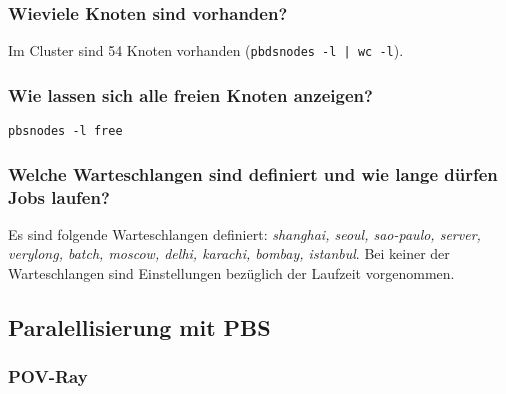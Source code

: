 \subsubsection{Wieviele Knoten sind vorhanden?}
	Im Cluster sind 54 Knoten vorhanden (\texttt{pbdsnodes -l | wc -l}).
\subsubsection{Wie lassen sich alle freien Knoten anzeigen?}
	\texttt{pbsnodes -l free}
\subsubsection{Welche Warteschlangen sind definiert und wie lange d\"urfen Jobs laufen?}
	Es sind folgende Warteschlangen definiert: 
	\textsl{shanghai, seoul, sao-paulo, server, verylong, batch, moscow, delhi,
	karachi, bombay, istanbul}.
	Bei keiner der Warteschlangen sind Einstellungen bezüglich der Laufzeit
	vorgenommen.

\subsection{Paralellisierung mit PBS}

\subsubsection{POV-Ray}
